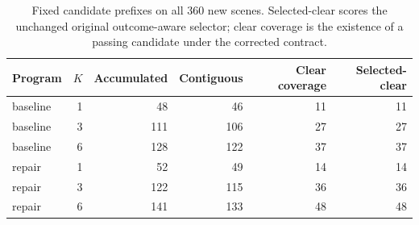 \begin{table}[H]\centering\small
\caption{Fixed candidate prefixes on all 360 new scenes. Selected-clear scores the unchanged original outcome-aware selector; clear coverage is the existence of a passing candidate under the corrected contract.}
\label{tab:v3-budget}
\begin{tabular}{lrrrrr}\toprule
Program & $K$ & Accumulated & Contiguous & Clear coverage & Selected-clear \\\midrule
baseline & 1 & 48 & 46 & 11 & 11 \\
baseline & 3 & 111 & 106 & 27 & 27 \\
baseline & 6 & 128 & 122 & 37 & 37 \\
repair & 1 & 52 & 49 & 14 & 14 \\
repair & 3 & 122 & 115 & 36 & 36 \\
repair & 6 & 141 & 133 & 48 & 48 \\
\bottomrule\end{tabular}\end{table}
